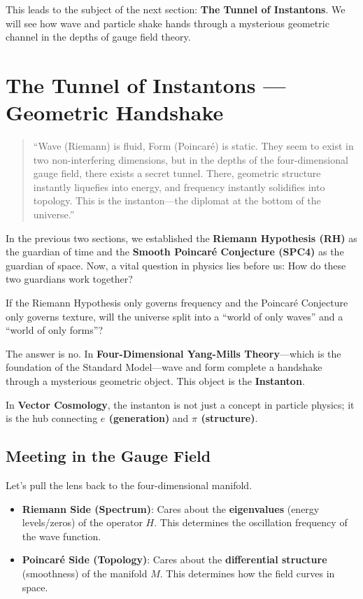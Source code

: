 This leads to the subject of the next section: \textbf{The Tunnel of Instantons}. We will see how wave and particle shake hands through a mysterious geometric channel in the depths of gauge field theory.

\section{The Tunnel of Instantons — Geometric Handshake}

\begin{quote}
``Wave (Riemann) is fluid, Form (Poincaré) is static. They seem to exist in two non-interfering dimensions, but in the depths of the four-dimensional gauge field, there exists a secret tunnel. There, geometric structure instantly liquefies into energy, and frequency instantly solidifies into topology. This is the instanton—the diplomat at the bottom of the universe.''
\end{quote}

In the previous two sections, we established the \textbf{Riemann Hypothesis (RH)} as the guardian of time and the \textbf{Smooth Poincaré Conjecture (SPC4)} as the guardian of space. Now, a vital question in physics lies before us: How do these two guardians work together?

If the Riemann Hypothesis only governs frequency and the Poincaré Conjecture only governs texture, will the universe split into a ``world of only waves'' and a ``world of only forms''?

The answer is no. In \textbf{Four-Dimensional Yang-Mills Theory}—which is the foundation of the Standard Model—wave and form complete a handshake through a mysterious geometric object. This object is the \textbf{Instanton}.

In \textbf{Vector Cosmology}, the instanton is not just a concept in particle physics; it is the hub connecting \textbf{$e$ (generation)} and \textbf{$\pi$ (structure)}.

\subsection{Meeting in the Gauge Field}

Let's pull the lens back to the four-dimensional manifold.

\begin{itemize}
\item \textbf{Riemann Side (Spectrum)}: Cares about the \textbf{eigenvalues} (energy levels/zeros) of the operator $H$. This determines the oscillation frequency of the wave function.

\item \textbf{Poincaré Side (Topology)}: Cares about the \textbf{differential structure} (smoothness) of the manifold $M$. This determines how the field curves in space.
\end{itemize}

